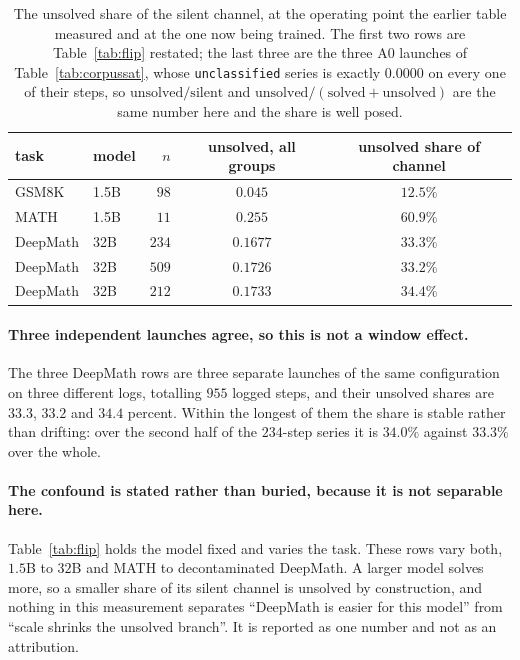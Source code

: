 \begin{table}[t]
\centering\small
\caption{The unsolved share of the silent channel, at the operating point the earlier table
measured and at the one now being trained. The first two rows are Table~\ref{tab:flip}
restated; the last three are the three A0 launches of Table~\ref{tab:corpussat}, whose
\texttt{unclassified} series is exactly $0.0000$ on every one of their steps, so
$\text{unsolved}/\text{silent}$ and $\text{unsolved}/(\text{solved}+\text{unsolved})$ are the
same number here and the share is well posed.}
\label{tab:supplyshare}
\begin{tabular}{llrcc}
\toprule
task & model & $n$ & unsolved, all groups & unsolved share of channel \\
\midrule
GSM8K    & 1.5B & $98$  & $0.045$  & $12.5\%$ \\
MATH     & 1.5B & $11$  & $0.255$  & $\mathbf{60.9\%}$ \\
\midrule
DeepMath & 32B  & $234$ & $0.1677$ & $\mathbf{33.3\%}$ \\
DeepMath & 32B  & $509$ & $0.1726$ & $33.2\%$ \\
DeepMath & 32B  & $212$ & $0.1733$ & $34.4\%$ \\
\bottomrule
\end{tabular}
\end{table}

\paragraph{Three independent launches agree, so this is not a window effect.} The three
DeepMath rows are three separate launches of the same configuration on three different logs,
totalling $955$ logged steps, and their unsolved shares are $33.3$, $33.2$ and $34.4$ percent.
Within the longest of them the share is stable rather than drifting: over the second half of
the $234$-step series it is $34.0\%$ against $33.3\%$ over the whole.

\paragraph{The confound is stated rather than buried, because it is not separable here.}
Table~\ref{tab:flip} holds the model fixed and varies the task. These rows vary both, $1.5$B
to $32$B and MATH to decontaminated DeepMath. A larger model solves more, so a smaller share
of its silent channel is unsolved by construction, and nothing in this measurement separates
``DeepMath is easier for this model'' from ``scale shrinks the unsolved branch''. It is
reported as one number and not as an attribution.

